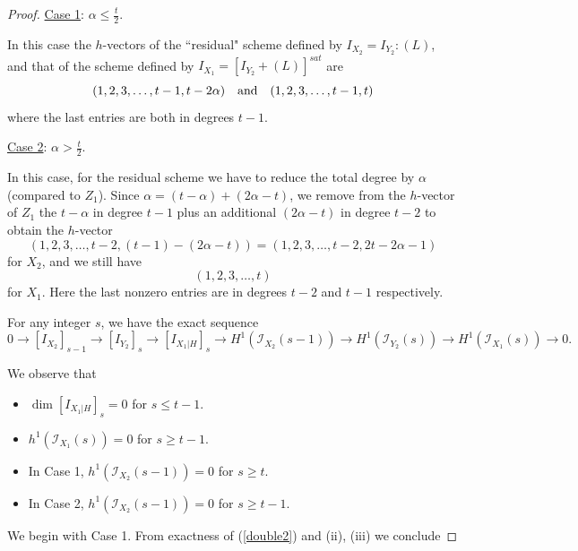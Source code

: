 \documentclass[12pt]{amsart}%
\numberwithin{equation}{section}
\theoremstyle{definition}
\numberwithin{equation}{section}
\begin{document}
\begin{proof}
\vspace{.2in}

\noindent \underline{Case 1}: $\alpha \leq \frac{t}{2}$.

In this case the $h$-vectors of the ``residual" scheme defined by $ I_{X_2} = I_{Y_2} : (L)$, and that of the scheme defined by $I_{X_1} = [I_{Y_2} +(L)]^{sat}$ are
\[
(1,2,3,\dots, t-1,t-2\alpha) \ \ \hbox{ and } \ \ (1,2,3,\dots, t-1, t)
\]
where the last entries are both in degrees $t-1$.

\vspace{.2in}

\noindent \underline{Case 2}: $\alpha > \frac{t}{2}$.

In this case, for the residual scheme we have to reduce the total degree by $\alpha$ (compared to $Z_1$). Since $\alpha = (t-\alpha) + (2\alpha - t)$, we remove from the $h$-vector of $Z_1$ the $t-\alpha$ in degree $t-1$ plus an additional $(2\alpha-t)$ in degree $t-2$ to obtain the $h$-vector 
\[
(1,2,3, \dots, t-2, (t-1) - (2\alpha -t) ) = (1,2,3,\dots, t-2, 2t-2\alpha -1)
\]
for $X_2$, and we still have 
\[
(1,2,3,\dots, t)
\]
for $X_1$.
Here the last nonzero entries are in degrees $t-2$ and $t-1$ respectively. 

 For any integer $s$, we have the exact sequence
\begin{equation} \label{double2}
0 \rightarrow [I_{X_2}]_{s-1} \rightarrow [I_{Y_2 }]_s \rightarrow [I_{X_1 |H}]_s \rightarrow H^1(\mathcal I_{X_2}(s-1)) \rightarrow H^1 (\mathcal I_{Y_2}(s)) \rightarrow H^1 (\mathcal I_{X_1}(s)) \rightarrow 0.
\end{equation}

\noindent We observe that

\begin{itemize}

\item[(i)] $\dim [I_{X_1|H}]_s = 0$ for $s \leq t-1$.

\item[(ii)] $h^1(\mathcal I_{X_1}(s)) = 0$ for $s \geq t-1$.

\item[(iii)] In Case 1, $h^1(\mathcal I_{X_2} (s-1)) = 0$ for $s \geq t$.

\item[(iv)] In Case 2, $h^1(\mathcal I_{X_2} (s-1)) = 0$ for $s \geq t-1$.
\end{itemize}

We begin with Case 1. From exactness of (\ref{double2}) and (ii), (iii) we conclude


\end{proof}
\end{document}
